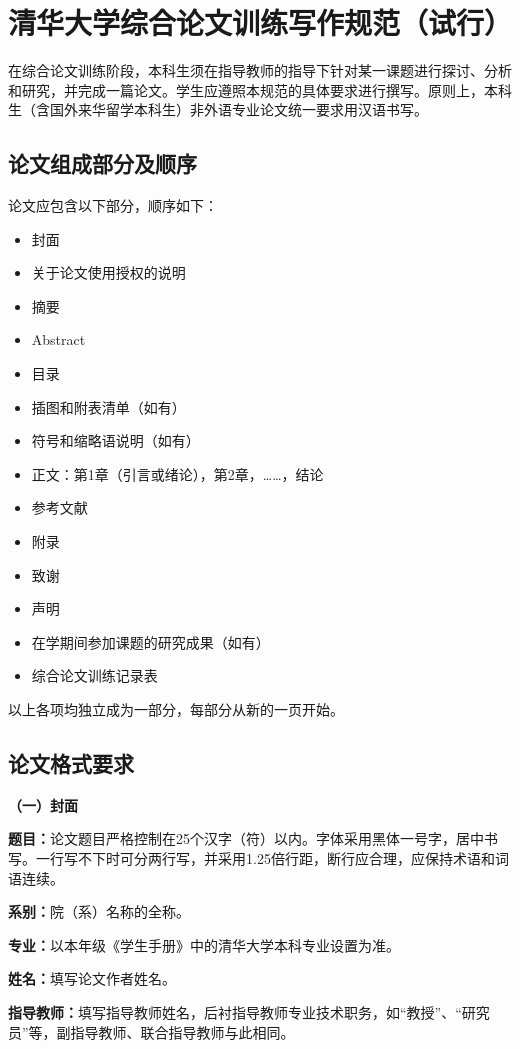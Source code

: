 \documentclass{Diploma}
\begin{document}
\chapter[require]{清华大学综合论文训练写作规范（试行）}
在综合论文训练阶段，本科生须在指导教师的指导下针对某一课题进行探讨、分析和研究，并完成一篇论文。学生应遵照本规范的具体要求进行撰写。原则上，本科生（含国外来华留学本科生）非外语专业论文统一要求用汉语书写。

\section{论文组成部分及顺序}
论文应包含以下部分，顺序如下：
\begin{itemize}
  \item 封面
  \item 关于论文使用授权的说明
  \item 摘要
  \item Abstract
  \item 目录
  \item 插图和附表清单（如有）
  \item 符号和缩略语说明（如有）
  \item 正文：第1章（引言或绪论），第2章，……，结论
  \item 参考文献
  \item 附录
  \item 致谢
  \item 声明
  \item 在学期间参加课题的研究成果（如有）
  \item 综合论文训练记录表
\end{itemize}
以上各项均独立成为一部分，每部分从新的一页开始。

\section{论文格式要求}

\noindent\textbf{（一）封面}

\textbf{题目：}论文题目严格控制在25个汉字（符）以内。字体采用黑体一号字，居中书写。一行写不下时可分两行写，并采用1.25倍行距，断行应合理，应保持术语和词语连续。

\textbf{系别：}院（系）名称的全称。

\textbf{专业：}以本年级《学生手册》中的清华大学本科专业设置为准。

\textbf{姓名：}填写论文作者姓名。

\textbf{指导教师：}填写指导教师姓名，后衬指导教师专业技术职务，如“教授”、“研究员”等，副指导教师、联合指导教师与此相同。
\end{document}
